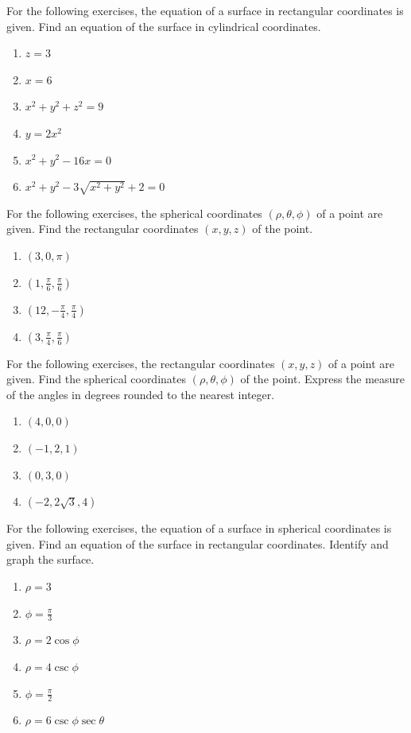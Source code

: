 \documentclass{exercises}
\begin{document}
For the following exercises, the equation of a surface in rectangular coordinates is given. Find an equation of the surface in cylindrical coordinates.

\begin{enumerate}[resume]
\item $z=3$
\item $x=6$
\item $x^{2}+y^{2}+z^{2}=9$
\item $y=2x^{2}$
\item $x^{2}+y^{2}-16x=0$
\item $x^{2}+y^{2}-3\sqrt{x^{2}+y^{2}}+2=0$
\end{enumerate}

For the following exercises, the spherical coordinates $(\rho,\theta,\phi)$ of a point are given. Find the rectangular coordinates $(x,y,z)$ of the point.

\begin{enumerate}[resume]
\item $(3,0,\pi)$
\item $(1,\frac{\pi}{6},\frac{\pi}{6})$
\item $(12,-\frac{\pi}{4},\frac{\pi}{4})$
\item $(3,\frac{\pi}{4},\frac{\pi}{6})$
\end{enumerate}

For the following exercises, the rectangular coordinates $(x,y,z)$ of a point are given. Find the spherical coordinates $(\rho,\theta,\phi)$ of the point. Express the measure of the angles in degrees rounded to the nearest integer.

\begin{enumerate}[resume]
\item $(4,0,0)$
\item $(-1,2,1)$
\item $(0,3,0)$
\item $(-2,2\sqrt{3},4)$
\end{enumerate}

For the following exercises, the equation of a surface in spherical coordinates is given. Find an equation of the surface in rectangular coordinates. Identify and graph the surface.

\begin{enumerate}[resume]
\item \techrequired $\rho=3$
\item \techrequired $\phi=\frac{\pi}{3}$
\item \techrequired $\rho=2\cos \phi$
\item \techrequired $\rho=4\csc \phi$
\item \techrequired $\phi=\frac{\pi}{2}$
\item \techrequired $\rho=6\csc \phi \sec \theta$
\end{enumerate}
\end{document}
